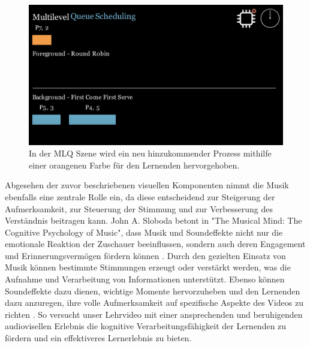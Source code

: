 \begin{figure}[h]
	\centering
	\includegraphics[width=0.8\linewidth]{img/screen_farben.png} 
	\caption{In der \ac{MLQ} Szene wird ein neu hinzukommender Prozess mithilfe einer orangenen Farbe für den Lernenden hervorgehoben.}
	\label{fig:screen_farben} 
\end{figure}


Abgesehen der zuvor beschriebenen visuellen Komponenten nimmt die Musik ebenfalls eine zentrale Rolle ein, da diese entscheidend zur Steigerung der Aufmerksamkeit, zur Steuerung der Stimmung und zur Verbesserung des Verständnis beitragen kann. John A. Sloboda betont in "The Musical Mind: The Cognitive Psychology of Music", dass Musik und Soundeffekte nicht nur die emotionale Reaktion der Zuschauer beeinflussen, sondern auch deren Engagement und Erinnerungsvermögen fördern können \autocite{sloboda_musical_1986}. Durch den gezielten Einsatz von Musik können bestimmte Stimmungen erzeugt oder verstärkt werden, was die Aufnahme und Verarbeitung von Informationen unterstützt. Ebenso können Soundeffekte dazu dienen, wichtige Momente hervorzuheben und den Lernenden dazu anzuregen, ihre volle Aufmerksamkeit auf spezifische Aspekte des Videos zu richten \autocite{sloboda_musical_1986}. 
So versucht unser Lehrvideo mit einer ansprechenden und beruhigenden audiovisellen Erlebnis die kognitive Verarbeitungsfähigkeit der Lernenden zu fördern und ein effektiveres Lernerlebnis zu bieten. 


